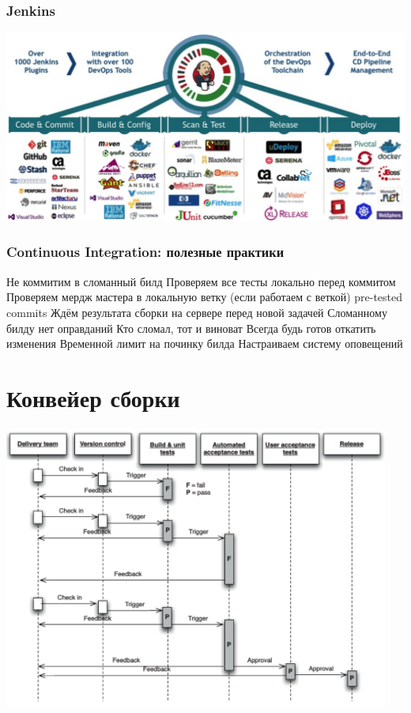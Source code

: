 \documentclass{../../slides-style}
\begin{document}
    \begin{frame}
        \frametitle{Jenkins}
        \begin{center}
            \includegraphics[width=\textwidth]{jenkins.png}
        \end{center}
    \end{frame}

    \begin{frame}
        \frametitle{Continuous Integration: полезные практики}
        \begin{outline}
            \1 Не коммитим в сломанный билд
            \1 Проверяем все тесты локально перед коммитом
                \2 Проверяем мердж мастера в локальную ветку (если работаем с веткой)
                \2 pre-tested commits
            \1 Ждём результата сборки на сервере перед новой задачей
            \1 Сломанному билду нет оправданий
                \2 Кто сломал, тот и виноват
                \2 Всегда будь готов откатить изменения
                \2 Временной лимит на починку билда
            \1 Настраиваем систему оповещений
        \end{outline}
    \end{frame}

    \section{Конвейер сборки}

    \begin{frame}
        \begin{center}
            \includegraphics[width=0.95\textwidth]{cdPipeline.png}
        \end{center}
    \end{frame}
\end{document}
